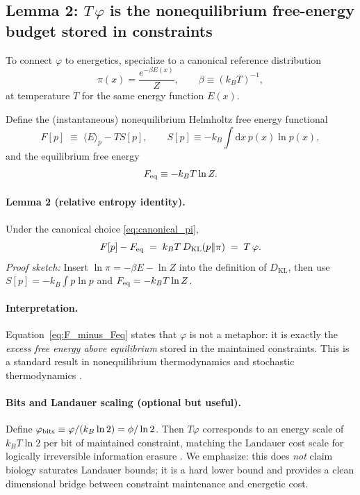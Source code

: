 \documentclass[10pt]{article}
\providecommand{\dd}{\mathrm{d}}
\begin{document}
\subsection{Lemma 2: $T\,\varphi$ is the nonequilibrium free-energy budget stored in constraints}
\label{sec:lemma2_free_energy}

To connect $\varphi$ to energetics, specialize to a canonical reference distribution
\begin{equation}
\pi(x)=\frac{e^{-\beta E(x)}}{Z},\qquad \beta\equiv (k_B T)^{-1},
\label{eq:canonical_pi}
\end{equation}
at temperature $T$ for the same energy function $E(x)$.

Define the (instantaneous) nonequilibrium Helmholtz free energy functional
\begin{equation}
F[p] \;\equiv\; \langle E\rangle_p - T S[p],
\qquad
S[p]\equiv -k_B\int \dd x\, p(x)\ln p(x),
\label{eq:F_def}
\end{equation}
and the equilibrium free energy
\begin{equation}
F_{\rm eq}\equiv -k_B T \ln Z.
\label{eq:Feq_def}
\end{equation}

\paragraph{Lemma 2 (relative entropy identity).}
Under the canonical choice \eqref{eq:canonical_pi},
\begin{equation}
F[p] - F_{\rm eq} \;=\; k_B T\,D_{\mathrm{KL}}(p\|\pi)
\;=\; T\,\varphi.
\label{eq:F_minus_Feq}
\end{equation}
\emph{Proof sketch:} Insert $\ln\pi=-\beta E-\ln Z$ into the definition of $D_{\mathrm{KL}}$, then
use $S[p]=-k_B\int p\ln p$ and $F_{\rm eq}=-k_B T\ln Z$.

\paragraph{Interpretation.}
Equation~\eqref{eq:F_minus_Feq} states that $\varphi$ is not a metaphor: it is exactly the
\emph{excess free energy above equilibrium} stored in the maintained constraints. This is a standard 
result in nonequilibrium thermodynamics and stochastic thermodynamics \cite{Seifert2012ST,Parrondo2015ThermoInfo}.

\paragraph{Bits and Landauer scaling (optional but useful).}
Define $\varphi_{\rm bits}\equiv \varphi/(k_B\ln 2)=\phi/\ln 2$. Then $T\varphi$ corresponds to an
energy scale of $k_B T\ln 2$ per bit of maintained constraint, matching the Landauer cost scale for 
logically irreversible information erasure \cite{Landauer1961,Bennett1982}.
We emphasize: this does \emph{not} claim biology saturates Landauer bounds; it is a hard lower bound
and provides a clean dimensional bridge between constraint maintenance and energetic cost.
\end{document}
